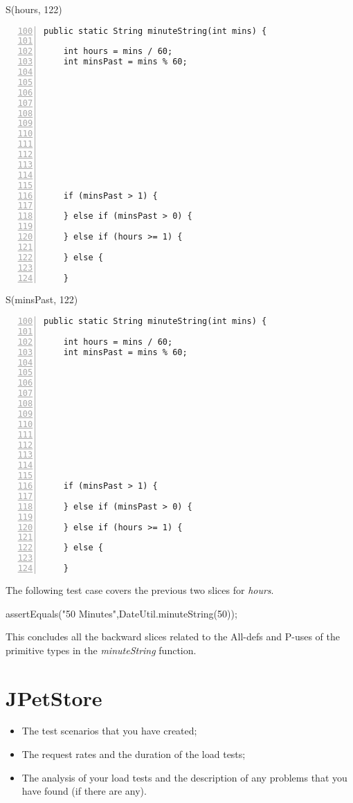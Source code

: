 \documentclass[fontsize=12pt,paper=letter,twoside]{scrartcl}
\begin{document}
S(hours, 122)
\begin{lstlisting}[numbers=left,firstnumber=100]
  public static String minuteString(int mins) {
    
    int hours = mins / 60;
    int minsPast = mins % 60;
    
    
    
    
    
     
    
     
    
     
    

    if (minsPast > 1) {
      
    } else if (minsPast > 0) {
      
    } else if (hours >= 1) {
    
    } else {
    
    }
\end{lstlisting}
S(minsPast, 122)
\begin{lstlisting}[numbers=left,firstnumber=100]
  public static String minuteString(int mins) {
    
    int hours = mins / 60;
    int minsPast = mins % 60;
    
    
    
    
    
     
    
     
    
     
    

    if (minsPast > 1) {
      
    } else if (minsPast > 0) {
      
    } else if (hours >= 1) {
    
    } else {
    
    }
\end{lstlisting}
The following test case covers the previous two slices for \emph{hours}.
\begin{code}
assertEquals("50 Minutes",DateUtil.minuteString(50));
\end{code}

This concludes all the backward slices related to the All-defs and P-uses of the primitive types in the \emph{minuteString} function.

\section{JPetStore}

\begin{itemize}
\item The test scenarios that you have created;
\item The request rates and the duration of the load tests;
\item The analysis of your load tests and the description of any problems that you have found (if there
are any).
\end{itemize}
\end{document}
